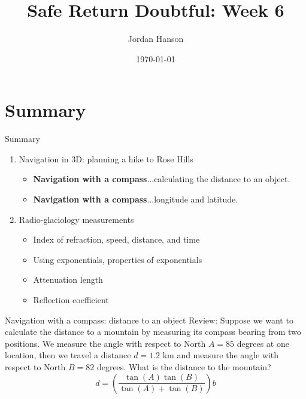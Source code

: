 \documentclass{beamer}
\title{Safe Return Doubtful: Week 6}
\date{\today}
\author{Jordan Hanson}
\institute{Whittier College Department of Physics and Astronomy}
\begin{document}
\maketitle

\section{Summary}

\begin{frame}{Summary}
\begin{enumerate}
\item Navigation in 3D: planning a hike to Rose Hills
\begin{itemize}
\item \textbf{Navigation with a compass}...calculating the distance to an object.
\item \textbf{Navigation with a compass}...longitude and latitude.
\end{itemize}
\item Radio-glaciology measurements
\begin{itemize}
\item Index of refraction, speed, distance, and time
\item Using exponentials, properties of exponentials
\item Attenuation length
\item Reflection coefficient
\end{itemize}
\end{enumerate}
\end{frame}

\begin{frame}{Navigation with a compass: distance to an object}
Review: Suppose we want to calculate the distance to a mountain by measuring its compass bearing from two positions.  We measure the angle with respect to North $A = 85$ degrees at one location, then we travel a distance $d = 1.2$ km and measure the angle with respect to North $B = 82$ degrees.  What is the distance to the mountain?
\begin{equation}
\boxed{
d = \left(\frac{\tan(A)\tan(B)}{\tan(A) + \tan(B)}\right)b}
\end{equation}
\end{frame}
\end{document}
